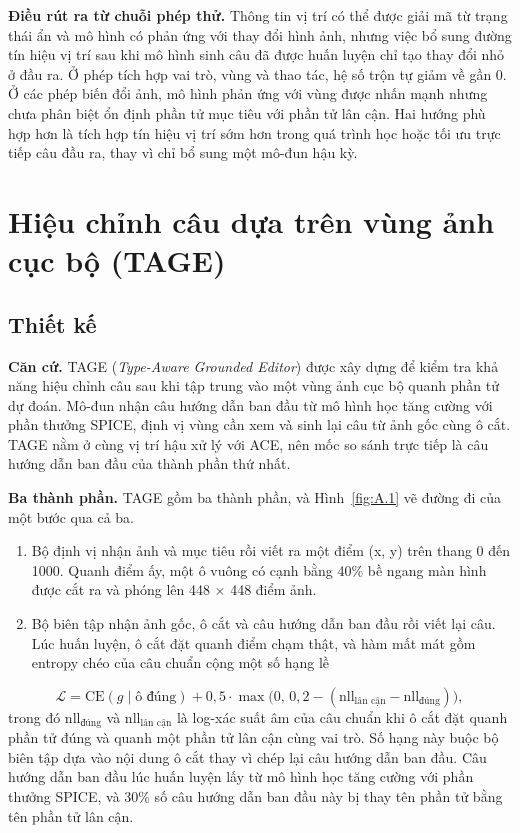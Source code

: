 \textbf{Điều rút ra từ chuỗi phép thử.} Thông tin vị trí có thể được giải mã từ trạng thái ẩn và mô hình có phản ứng với thay đổi hình ảnh, nhưng việc bổ sung đường tín hiệu vị trí sau khi mô hình sinh câu đã được huấn luyện chỉ tạo thay đổi nhỏ ở đầu ra. Ở phép tích hợp vai trò, vùng và thao tác, hệ số trộn tự giảm về gần 0. Ở các phép biến đổi ảnh, mô hình phản ứng với vùng được nhấn mạnh nhưng chưa phân biệt ổn định phần tử mục tiêu với phần tử lân cận. Hai hướng phù hợp hơn là tích hợp tín hiệu vị trí sớm hơn trong quá trình học hoặc tối ưu trực tiếp câu đầu ra, thay vì chỉ bổ sung một mô-đun hậu kỳ.

\section{Hiệu chỉnh câu dựa trên vùng ảnh cục bộ (TAGE)}\label{sec:A.7}

\subsection{Thiết kế}\label{sec:A.7.1}

\textbf{Căn cứ.} TAGE (\emph{Type-Aware Grounded Editor}) được xây dựng để kiểm tra khả năng hiệu chỉnh câu sau khi tập trung vào một vùng ảnh cục bộ quanh phần tử dự đoán. Mô-đun nhận câu hướng dẫn ban đầu từ mô hình học tăng cường với phần thưởng SPICE, định vị vùng cần xem và sinh lại câu từ ảnh gốc cùng ô cắt. TAGE nằm ở cùng vị trí hậu xử lý với ACE, nên mốc so sánh trực tiếp là câu hướng dẫn ban đầu của thành phần thứ nhất.

\textbf{Ba thành phần.} TAGE gồm ba thành phần, và Hình~\ref{fig:A.1} vẽ đường đi của một bước qua cả ba.

\begin{enumerate}
\item Bộ định vị nhận ảnh và mục tiêu rồi viết ra một điểm (x, y) trên thang 0 đến 1000. Quanh điểm ấy, một ô vuông có cạnh bằng 40\% bề ngang màn hình được cắt ra và phóng lên 448 $\times$ 448 điểm ảnh.
\item Bộ biên tập nhận ảnh gốc, ô cắt và câu hướng dẫn ban đầu rồi viết lại câu. Lúc huấn luyện, ô cắt đặt quanh điểm chạm thật, và hàm mất mát gồm entropy chéo của câu chuẩn cộng một số hạng lề
\end{enumerate}

\begin{equation}
\mathcal{L}=\mathrm{CE}(g\mid \text{ô đúng})+0{,}5\cdot\max\bigl(0,\,0{,}2-(\mathrm{nll}_{\text{lân cận}}-\mathrm{nll}_{\text{đúng}})\bigr),
\label{eq:A.1}
\end{equation}
\noindent
trong đó $\mathrm{nll}_{\text{đúng}}$ và $\mathrm{nll}_{\text{lân cận}}$ là log-xác suất âm của câu chuẩn khi ô cắt đặt quanh phần tử đúng và quanh một phần tử lân cận cùng vai trò. Số hạng này buộc bộ biên tập dựa vào nội dung ô cắt thay vì chép lại câu hướng dẫn ban đầu. Câu hướng dẫn ban đầu lúc huấn luyện lấy từ mô hình học tăng cường với phần thưởng SPICE, và 30\% số câu hướng dẫn ban đầu này bị thay tên phần tử bằng tên phần tử lân cận.

